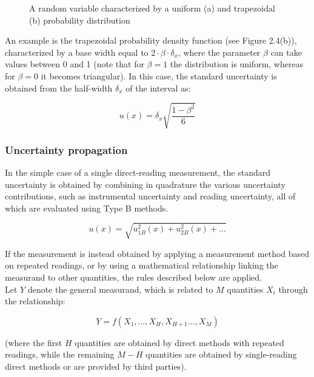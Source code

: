 \documentclass[../main.tex]{subfiles}
\begin{document}
\begin{figure}[h!]
\begin{center}
\end{center}	
\label{FigZZ}
\caption{A random variable characterized by a uniform (a) and trapezoidal (b) probability distribution}
\end{figure}


An example is the trapezoidal probability density function (see Figure 2.4(b)), characterized by a base width equal to $2 \cdot \beta \cdot \delta_x$, where the parameter $\beta$ can take values between 0 and 1 (note that for $\beta = 1$ the distribution is uniform, whereas for $\beta = 0$ it becomes triangular).
In this case, the standard uncertainty is obtained from the half-width $\delta_x$ of the interval as:
  
\begin{equation}
  	u(x) = \delta_x \sqrt{\frac{1 - \beta^2}{6}}
\end{equation}

\subsubsection{Uncertainty propagation}
\label{uncprop243}

In the simple case of a single direct-reading measurement, the standard uncertainty is obtained by combining in quadrature the various uncertainty contributions, such as instrumental uncertainty and reading uncertainty, all of which are evaluated using Type B methods.

\begin{equation}
	u(x) = \sqrt{u_{1B}^2(x) + u_{2B}^2(x) + \dots}
\end{equation}

If the measurement is instead obtained by applying a measurement method based on repeated readings, or by using a mathematical relationship linking the measurand to other quantities, the rules described below are applied.\\

Let $Y$ denote the general measurand, which is related to $M$ quantities $X_i$ through the relationship:

\begin{equation}
	Y = f \left( X_1, \dots, X_H, X_{H+1} \dots, X_M \right)
\end{equation}

(where the first $H$ quantities are obtained by direct methods with repeated readings, while the remaining $M-H$ quantities are obtained by single-reading direct methods or are provided by third parties).
\end{document}
